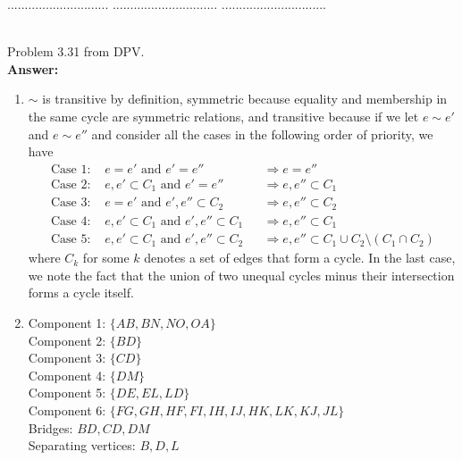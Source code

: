 \documentclass[a4paper,11pt]{article}
\begin{document}
\pagebreak

 $.............................$
 $..............................$
          $..............................$\\

\bigskip

\\
Problem 3.31 from DPV.\\
{\bf Answer:}
\begin{enumerate}[label=(\alph*)]
    \item
        $\sim$ is transitive by definition, symmetric because equality and membership in the same cycle are symmetric relations, and transitive because if we let $e \sim e'$ and $e \sim e''$ and consider all the cases in the following order of priority, we have
        \begin{align*}
            \text{Case 1: } &e = e' \text{ and } e' = e'' & &\Rightarrow e = e'' \\
            \text{Case 2: } &e, e' \subset C_1 \text{ and } e' = e'' & &\Rightarrow e, e'' \subset C_1 \\
            \text{Case 3: } &e = e' \text{ and } e', e'' \subset C_2 & &\Rightarrow e, e'' \subset C_2 \\
            \text{Case 4: } &e, e' \subset C_1 \text{ and } e', e'' \subset C_1 & &\Rightarrow e, e'' \subset C_1 \\
            \text{Case 5: } &e, e' \subset C_1 \text{ and } e', e'' \subset C_2 & &\Rightarrow e, e'' \subset C_1 \cup C_2 \setminus (C_1 \cap C_2)
        \end{align*}
        where $C_k$ for some $k$ denotes a set of edges that form a cycle. In the last case, we note the fact that the union of two unequal cycles minus their intersection forms a cycle itself.

    \item
        Component 1: $\{ AB, BN, NO, OA \}$ \\
        Component 2: $\{ BD \}$ \\
        Component 3: $\{ CD \}$ \\
        Component 4: $\{ DM \}$ \\
        Component 5: $\{ DE, EL, LD \}$ \\
        Component 6: $\{ FG, GH, HF, FI, IH, IJ, HK, LK, KJ, JL \}$ \\
        Bridges: $BD, CD, DM$ \\
        Separating vertices: $B, D, L$


\end{enumerate}
\end{document}
